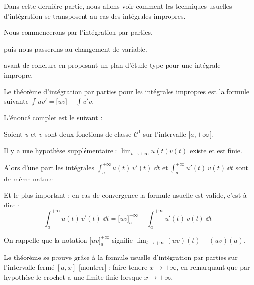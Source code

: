 







\debuttexte


\diapo

Dans cette dernière partie, nous allons voir comment 
les techniques usuelles d'intégration se transposent 
au cas des intégrales impropres.

\change

\change

Nous commencerons par l'intégration par parties,

\change

puis nous passerons au changement de variable,

\change

avant de conclure en proposant un plan d'étude 
type pour une intégrale impropre.



\diapo

Le théorème d'intégration par parties pour les intégrales 
impropres est la formule suivante 
$\int u v'= \big[uv\big] - \int u' v$.

\change

L'énoncé complet est le suivant :

 Soient $u$ et $v$ sont deux fonctions de classe 
 $\mathcal{C}^1$ sur l'intervalle $[a,+\infty[$.
 
Il y a une hypothèse supplémentaire :
$\lim_{t\to+\infty} u(t)v(t)$ existe et est finie.

Alors d'une part les intégrales 
$\displaystyle\int_a^{+\infty} u(t) \, v'(t)\;\dd t$
et $\displaystyle\int_a^{+\infty} u'(t) \, v(t)\;\dd t$ 
sont de même nature.

Et le plus important : en cas de convergence la formule usuelle 
est valide, c'est-à-dire  :
$$\int_a^{+\infty} u(t) \, v'(t)\;\dd t 
= \big[uv\big]_a^{+\infty} - \int_a^{+\infty} u'(t) \, v(t)\;\dd t$$

\change

On rappelle que la notation $\big[uv\big]_a^{+\infty}$ signifie 
$\lim_{t\to+\infty} (uv)(t) - (uv)(a)$.


\change

Le théorème se prouve grâce à la formule usuelle d'intégration 
par parties sur l'intervalle fermé $[a,x]$ [montrer] :
faire tendre $x\to +\infty$,
en remarquant que par hypothèse le crochet a une limite finie 
lorsque $x\to +\infty$, 

